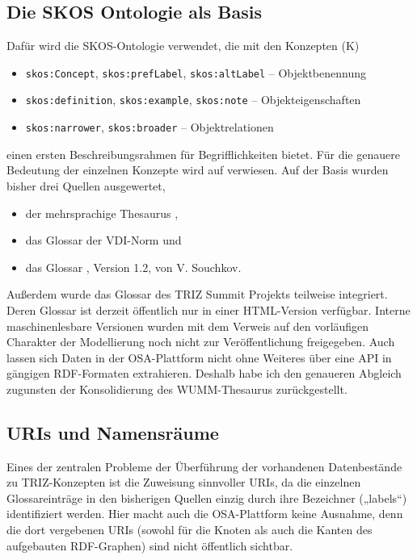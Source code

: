 \documentclass[11pt,a4paper]{article}
\begin{document}
\subsection{Die SKOS Ontologie als Basis}

Dafür wird die SKOS-Ontologie \cite{SKOS} verwendet, die mit den Konzepten (K)
\begin{itemize}[noitemsep]
\item \texttt{skos:Concept}, \texttt{skos:prefLabel}, \texttt{skos:altLabel}
  -- Objektbenennung
\item \texttt{skos:definition}, \texttt{skos:example}, \texttt{skos:note} --
  Objekteigenschaften
\item \texttt{skos:narrower}, \texttt{skos:broader} -- Objektrelationen
\end{itemize}
einen ersten Beschreibungsrahmen für Begrifflichkeiten bietet.  Für die
genauere Bedeutung der einzelnen Konzepte wird auf \cite{SKOS} verwiesen.  Auf
der Basis wurden bisher drei Quellen ausgewertet,
\begin{itemize}[noitemsep]
\item der mehrsprachige Thesaurus \cite{GSA},
\item das Glossar der VDI-Norm \cite{VDI} und
\item das Glossar \cite{SG}, Version 1.2, von V. Souchkov.
\end{itemize}
Außerdem wurde das Glossar des TRIZ Summit Projekts teilweise integriert.
Deren Glossar ist derzeit öffentlich nur in einer HTML-Version verfügbar.
Interne maschinenlesbare Versionen wurden mit dem Verweis auf den vorläufigen
Charakter der Modellierung noch nicht zur Veröffentlichung freigegeben.  Auch
lassen sich Daten in der OSA-Plattform nicht ohne Weiteres über eine API in
gängigen RDF-Formaten extrahieren. Deshalb habe ich den genaueren Abgleich
zugunsten der Konsolidierung des WUMM-Thesaurus zurückgestellt.

\subsection{URIs und Namensräume}

Eines der zentralen Probleme der Überführung der vorhandenen Datenbestände zu
TRIZ-Konzepten ist die Zuweisung sinnvoller URIs, da die einzelnen
Glossareinträge in den bisherigen Quellen einzig durch ihre Bezeichner
(„labels“) identifiziert werden.  Hier macht auch die OSA-Plattform keine
Ausnahme, denn die dort vergebenen URIs (sowohl für die Knoten als auch die
Kanten des aufgebauten RDF-Graphen) sind nicht öffentlich sichtbar.
\end{document}
